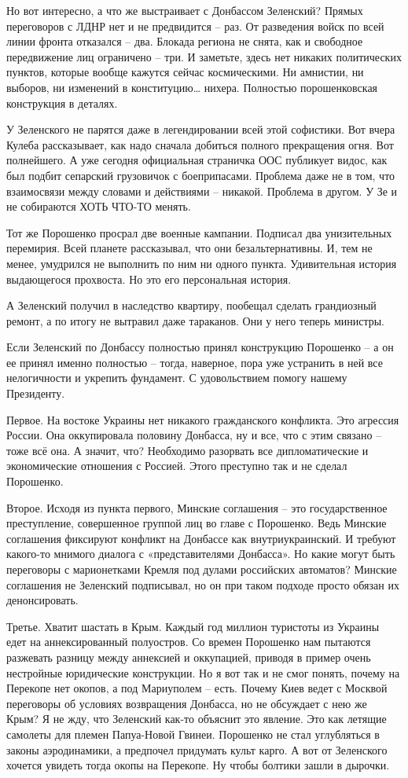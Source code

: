 Но вот интересно, а что же выстраивает с Донбассом Зеленский? Прямых
переговоров с ЛДНР нет и не предвидится – раз. От разведения войск по всей
линии фронта отказался – два. Блокада региона не снята, как и свободное
передвижение лиц ограничено – три. И заметьте, здесь нет никаких политических
пунктов, которые вообще кажутся сейчас космическими. Ни амнистии, ни выборов,
ни изменений в конституцию… нихера. Полностью порошенковская конструкция в
деталях.

У Зеленского не парятся даже в легендировании всей этой софистики. Вот вчера
Кулеба рассказывает, как надо сначала добиться полного прекращения огня. Вот
полнейшего. А уже сегодня официальная страничка ООС публикует видос, как был
подбит сепарский грузовичок с боеприпасами. Проблема даже не в том, что
взаимосвязи между словами и действиями – никакой. Проблема в другом. У Зе и не
собираются ХОТЬ ЧТО-ТО менять.

Тот же Порошенко просрал две военные кампании. Подписал два унизительных
перемирия. Всей планете рассказывал, что они безальтернативны. И, тем не менее,
умудрился не выполнить по ним ни одного пункта. Удивительная история
выдающегося прохвоста. Но это его персональная история.

А Зеленский получил в наследство квартиру, пообещал сделать грандиозный ремонт,
а по итогу не вытравил даже тараканов. Они у него теперь министры.

Если Зеленский по Донбассу полностью принял конструкцию Порошенко – а он ее
принял именно полностью – тогда, наверное, пора уже устранить в ней все
нелогичности и укрепить фундамент. С удовольствием помогу нашему Президенту.

Первое. На востоке Украины нет никакого гражданского конфликта. Это агрессия
России. Она оккупировала половину Донбасса, ну и все, что с этим связано – тоже
всё она. А значит, что? Необходимо разорвать все дипломатические и
экономические отношения с Россией. Этого преступно так и не сделал Порошенко.

Второе. Исходя из пункта первого, Минские соглашения – это государственное
преступление, совершенное группой лиц во главе с Порошенко. Ведь Минские
соглашения фиксируют конфликт на Донбассе как внутриукраинский. И требуют
какого-то мнимого диалога с «представителями Донбасса». Но какие могут быть
переговоры с марионетками Кремля под дулами российских автоматов? Минские
соглашения не Зеленский подписывал, но он при таком подходе просто обязан их
денонсировать.

Третье. Хватит шастать в Крым. Каждый год миллион туристоты из Украины едет на
аннексированный полуостров. Со времен Порошенко нам пытаются разжевать разницу
между аннексией и оккупацией, приводя в пример очень нестройные юридические
конструкции. Но я вот так и не смог понять, почему на Перекопе нет окопов, а
под Мариуполем – есть. Почему Киев ведет с Москвой переговоры об условиях
возвращения Донбасса, но не обсуждает с нею же Крым? Я не жду, что Зеленский
как-то объяснит это явление. Это как летящие самолеты для племен Папуа-Новой
Гвинеи. Порошенко не стал углубляться в законы аэродинамики, а предпочел
придумать культ карго. А вот от Зеленского хочется увидеть тогда окопы на
Перекопе. Ну чтобы болтики зашли в дырочки.

